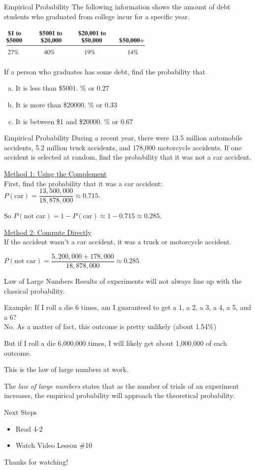 \documentclass[t, aspectratio=169]{beamer}
\newcommand{\?}{\stackrel{?}{=}}
\begin{document}
	\begin{frame}{Empirical Probability}
		The following information shows the amount of debt students who graduated from college incur for a specific year.
		
		\includegraphics[width=3in]{college-debt.png}
		
		If a person who graduates has some debt, find the probability that \begin{enumerate}[a)]
			\item It is less than \$5001. \% or $0.27$
			\item It is more than \$20000. \% or $0.33$
			\item It is between \$1 and \$20000. \% or $0.67$
		\end{enumerate}
	\end{frame}

	\begin{frame}{Empirical Probability}
		During a recent year, there were 13.5 million automobile accidents, 5.2 million truck accidents, and 178,000 motorcycle accidents. If one accident is selected at random, find the probability that it was not a car accident. \pause
		
		\underline{Method 1: Using the Complement} \\
		First, find the probability that it was a car accident: $P(\text{car}) = \dfrac{13,500,000}{18,878,000} \approx 0.715$. \pause
		
		So $P(\text{not car}) = 1 - P(\text{car}) \approx 1 - 0.715 \approx 0.285$. \pause
		
		\underline{Method 2: Compute Directly} \\
		If the accident wasn't a car accident, it was a truck or motorcycle accident.
		
		$P(\text{not car}) = \dfrac{5,200,000 + 178,000}{18,878,000} \approx 0.285$
	\end{frame}

	\begin{frame}{Law of Large Numbers}
		Results of experiments will not always line up with the classical probability.
		
		Example: If I roll a die 6 times, am I guaranteed to get a 1, a 2, a 3, a 4, a 5, and a 6? \pause \\
		No. As a matter of fact, this outcome is pretty unlikely (about 1.54\%)
		
		But if I roll a die 6,000,000 times, I will likely get about 1,000,000 of each outcome. \pause
		
		This is the law of large numbers at work. \pause
		
		The \textit{law of large numbers} states that as the number of trials of an experiment increases, the empirical probability will approach the theoretical probability.
	\end{frame}

	\begin{frame}{Next Steps}
		\begin{itemize}
			\item Read 4-2
			\item Watch Video Lesson \#10
		\end{itemize}
	
		\vfill
		
		Thanks for watching!
	\end{frame}
	
\end{document}
